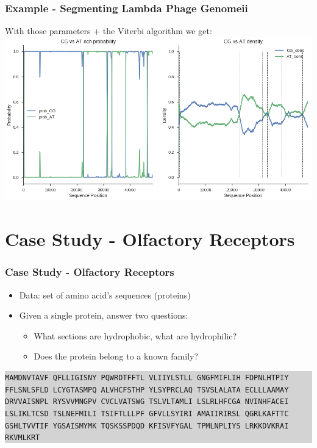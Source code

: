\documentclass[11pt]{beamer}
\begin{document}
    \begin{frame}
        \frametitle{Example - Segmenting Lambda Phage Genome\quad ii}
        With those parameters + the Viterbi algorithm we get:
        \centering
        \includegraphics[width=\textwidth]{images/lp_seg_results.png}
    \end{frame}
    
   
    \section{Case Study - Olfactory Receptors}
    \begin{frame}
        \frametitle{Case Study - Olfactory Receptors}
        \begin{itemize}
            \item Data: set of amino acid's sequences (proteins)
            \item Given a single protein, answer two questions:
            \begin{itemize}
                \item What sections are hydrophobic, what are hydrophilic?
                \item Does the protein belong to a known family?
            \end{itemize}
        \end{itemize}
        \colorbox{lightgray}{
            \centering
            \begin{minipage}{0.81\textwidth}
                \small{\texttt{MAMDNVTAVF QFLLIGISNY PQWRDTFFTL VLIIYLSTLL GNGFMIFLIH FDPNLHTPIY
                        FFLSNLSFLD LCYGTASMPQ ALVHCFSTHP YLSYPRCLAQ TSVSLALATA ECLLLAAMAY
                        DRVVAISNPL RYSVVMNGPV CVCLVATSWG TSLVLTAMLI LSLRLHFCGA NVINHFACEI
                        LSLIKLTCSD TSLNEFMILI TSIFTLLLPF GFVLLSYIRI AMAIIRIRSL QGRLKAFTTC
                        GSHLTVVTIF YGSAISMYMK TQSKSSPDQD KFISVFYGAL TPMLNPLIYS LRKKDVKRAI
                        RKVMLKRT}}
            \end{minipage}
        }

    \end{frame}
    
\end{document}
